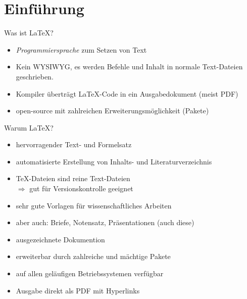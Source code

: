 \section{Einführung}

\begin{frame}{Was ist \LaTeX?}
  \begin{itemize}
    \item \emph{Programmiersprache} zum Setzen von Text
    \item Kein WYSIWYG, es werden Befehle und Inhalt in normale Text-Dateien geschrieben.
    \item Kompiler überträgt \LaTeX-Code in ein Ausgabedokument (meist PDF)
    \item open-source mit zahlreichen Erweiterungsmöglichkeit (Pakete)
  \end{itemize}
\end{frame}

\begin{frame}{Warum \LaTeX?}
  \begin{itemize}
    \item hervorragender Text- und Formelsatz
    \item automatisierte Erstellung von Inhalts- und Literaturverzeichnis
    \item \TeX-Dateien sind reine Text-Dateien \\
          $\Rightarrow$ gut für Versionskontrolle geeignet
    \item sehr gute Vorlagen für wissenschaftliches Arbeiten
    \item aber auch: Briefe, Notensatz, Präsentationen (auch diese)
    \item ausgezeichnete Dokumention
    \item erweiterbar durch zahlreiche und mächtige Pakete
    \item auf allen geläufigen Betriebssystemen verfügbar
    \item Ausgabe direkt als PDF mit Hyperlinks
  \end{itemize}
\end{frame}

